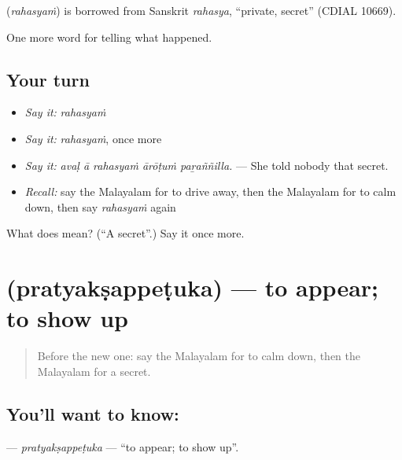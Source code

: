 \begin{cousinweb}
\textbf{} (\emph{rahasyaṁ}) is borrowed from Sanskrit \emph{rahasya}, \textquotedblleft{}private, secret\textquotedblright{} (CDIAL 10669).
\end{cousinweb}

\begin{grammarlens}[title={What you've built}]
One more word for telling what happened.
\end{grammarlens}

\subsection*{Your turn}
\begin{itemize}
\raggedright
  \item \emph{Say it:} \emph{rahasyaṁ}
  \item \emph{Say it:} \emph{rahasyaṁ}, once more
  \item \emph{Say it:} \emph{avaḷ ā rahasyaṁ ārōṭuṁ paṟaññilla.} — She told nobody that secret.
  \item \emph{Recall:} say the Malayalam for to drive away, then the Malayalam for to calm down, then say \emph{rahasyaṁ} again
\end{itemize}

\begin{tcolorbox}[breakable,colback=teal!4,colframe=teal!35!black,title={Before you move on}]
What does  mean? (\textquotedblleft{}A secret\textquotedblright{}.) Say it once more.
\end{tcolorbox}
\section[\texorpdfstring{\ml{പ്രത്യക്ഷപ്പെടുക} (pratyakṣappeṭuka)}{പ്രത്യക്ഷപ്പെടുക (pratyakṣappeṭuka)}]{ (pratyakṣappeṭuka) — to appear; to show up}

\label{lesson:ML-C383-pratyaksappetuka}



\begin{quote}
Before the new one: say the Malayalam for to calm down, then the Malayalam for a secret.
\end{quote}

\subsection*{You'll want to know: }
\textbf{} — \emph{pratyakṣappeṭuka} — \textquotedblleft{}to appear; to show up\textquotedblright{}.

